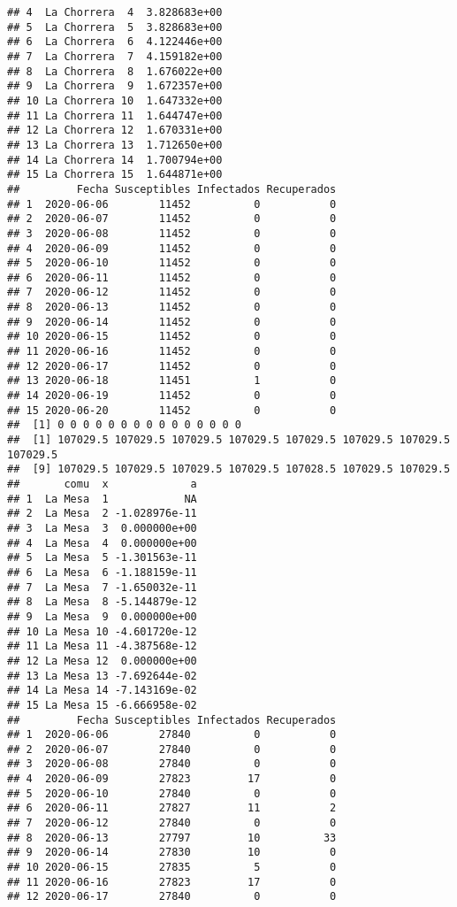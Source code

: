 \documentclass[
]{article}
\begin{document}
\begin{verbatim}
## 4  La Chorrera  4  3.828683e+00
## 5  La Chorrera  5  3.828683e+00
## 6  La Chorrera  6  4.122446e+00
## 7  La Chorrera  7  4.159182e+00
## 8  La Chorrera  8  1.676022e+00
## 9  La Chorrera  9  1.672357e+00
## 10 La Chorrera 10  1.647332e+00
## 11 La Chorrera 11  1.644747e+00
## 12 La Chorrera 12  1.670331e+00
## 13 La Chorrera 13  1.712650e+00
## 14 La Chorrera 14  1.700794e+00
## 15 La Chorrera 15  1.644871e+00
##         Fecha Susceptibles Infectados Recuperados
## 1  2020-06-06        11452          0           0
## 2  2020-06-07        11452          0           0
## 3  2020-06-08        11452          0           0
## 4  2020-06-09        11452          0           0
## 5  2020-06-10        11452          0           0
## 6  2020-06-11        11452          0           0
## 7  2020-06-12        11452          0           0
## 8  2020-06-13        11452          0           0
## 9  2020-06-14        11452          0           0
## 10 2020-06-15        11452          0           0
## 11 2020-06-16        11452          0           0
## 12 2020-06-17        11452          0           0
## 13 2020-06-18        11451          1           0
## 14 2020-06-19        11452          0           0
## 15 2020-06-20        11452          0           0
##  [1] 0 0 0 0 0 0 0 0 0 0 0 0 0 0 0
##  [1] 107029.5 107029.5 107029.5 107029.5 107029.5 107029.5 107029.5 107029.5
##  [9] 107029.5 107029.5 107029.5 107029.5 107028.5 107029.5 107029.5
##       comu  x             a
## 1  La Mesa  1            NA
## 2  La Mesa  2 -1.028976e-11
## 3  La Mesa  3  0.000000e+00
## 4  La Mesa  4  0.000000e+00
## 5  La Mesa  5 -1.301563e-11
## 6  La Mesa  6 -1.188159e-11
## 7  La Mesa  7 -1.650032e-11
## 8  La Mesa  8 -5.144879e-12
## 9  La Mesa  9  0.000000e+00
## 10 La Mesa 10 -4.601720e-12
## 11 La Mesa 11 -4.387568e-12
## 12 La Mesa 12  0.000000e+00
## 13 La Mesa 13 -7.692644e-02
## 14 La Mesa 14 -7.143169e-02
## 15 La Mesa 15 -6.666958e-02
##         Fecha Susceptibles Infectados Recuperados
## 1  2020-06-06        27840          0           0
## 2  2020-06-07        27840          0           0
## 3  2020-06-08        27840          0           0
## 4  2020-06-09        27823         17           0
## 5  2020-06-10        27840          0           0
## 6  2020-06-11        27827         11           2
## 7  2020-06-12        27840          0           0
## 8  2020-06-13        27797         10          33
## 9  2020-06-14        27830         10           0
## 10 2020-06-15        27835          5           0
## 11 2020-06-16        27823         17           0
## 12 2020-06-17        27840          0           0

\end{verbatim}
\end{document}

